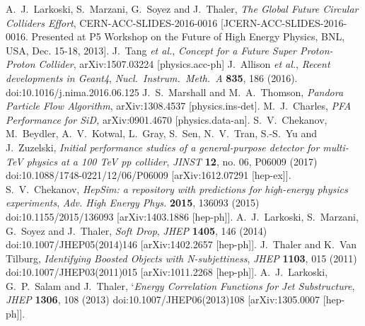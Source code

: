 \documentclass[a4paper]{PoS}
\begin{document}
\begin{thebibliography}{99}
  A.~J.~Larkoski, S.~Marzani, G.~Soyez and J.~Thaler,
  \emph{The Global Future Circular Colliders Effort},
  CERN-ACC-SLIDES-2016-0016
  [JCERN-ACC-SLIDES-2016-0016. Presented at P5 Workshop on the Future of High Energy Physics, BNL, USA, Dec. 15-18,  2013].
  J.~Tang {\it et al.},
  \emph{Concept for a Future Super Proton-Proton Collider},
  arXiv:1507.03224 [physics.acc-ph]
  J.~Allison {\it et al.},
  \emph{Recent developments in Geant4},
  \emph{Nucl.\ Instrum.\ Meth.\ A} {\bf 835}, 186 (2016).
  doi:10.1016/j.nima.2016.06.125
  J.~S.~Marshall and M.~A.~Thomson,
  \emph{Pandora Particle Flow Algorithm},
  arXiv:1308.4537 [physics.ins-det].
  M.~J.~Charles,
   \emph{PFA Performance for SiD,}
  arXiv:0901.4670 [physics.data-an].
  S.~V.~Chekanov, M.~Beydler, A.~V.~Kotwal, L.~Gray, S.~Sen, N.~V.~Tran, S.-S.~Yu and J.~Zuzelski,
  \emph{Initial performance studies of a general-purpose detector for multi-TeV physics at a 100 TeV pp collider},
  \emph{JINST} {\bf 12}, no. 06, P06009 (2017)
  doi:10.1088/1748-0221/12/06/P06009
  [arXiv:1612.07291 [hep-ex]].
  S.~V.~Chekanov,
  \emph{HepSim: a repository with predictions for high-energy physics experiments},
  \emph{Adv. High Energy Phys.}  {\bf 2015}, 136093 (2015)
  doi:10.1155/2015/136093
  [arXiv:1403.1886 [hep-ph]].
  A.~J.~Larkoski, S.~Marzani, G.~Soyez and J.~Thaler,
  \emph{Soft Drop},
  \emph{JHEP} {\bf 1405}, 146 (2014)
  doi:10.1007/JHEP05(2014)146
  [arXiv:1402.2657 [hep-ph]].
  J.~Thaler and K.~Van Tilburg,
  \emph{Identifying Boosted Objects with N-subjettiness},
  \emph{JHEP} {\bf 1103}, 015 (2011)
  doi:10.1007/JHEP03(2011)015
  [arXiv:1011.2268 [hep-ph]].
  A.~J.~Larkoski, G.~P.~Salam and J.~Thaler,
  `\emph{Energy Correlation Functions for Jet Substructure},
  \emph{JHEP} {\bf 1306}, 108 (2013)
  doi:10.1007/JHEP06(2013)108
  [arXiv:1305.0007 [hep-ph]].
\end{thebibliography}
\end{document}
